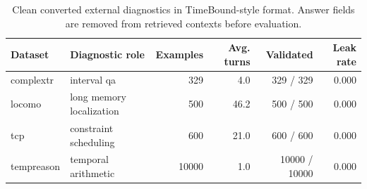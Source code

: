 \begin{table}[t]
\centering
\small
\begin{tabular}{llrrrr}
\toprule
Dataset & Diagnostic role & Examples & Avg. turns & Validated & Leak rate \\
\midrule
complextr & interval qa & 329 & 4.0 & 329 / 329 & 0.000 \\
locomo & long memory localization & 500 & 46.2 & 500 / 500 & 0.000 \\
tcp & constraint scheduling & 600 & 21.0 & 600 / 600 & 0.000 \\
tempreason & temporal arithmetic & 10000 & 1.0 & 10000 / 10000 & 0.000 \\
\bottomrule
\end{tabular}
\caption{Clean converted external diagnostics in TimeBound-style format. Answer fields are removed from retrieved contexts before evaluation.}
\label{tab:external_clean_final_stats}
\end{table}
